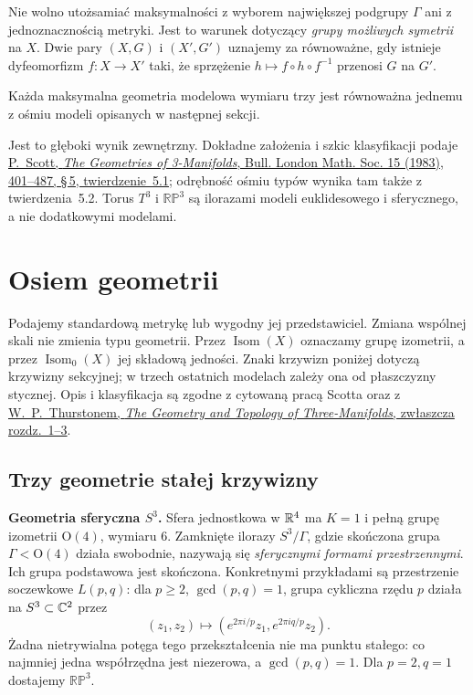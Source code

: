 Nie wolno utożsamiać maksymalności z wyborem największej
podgrupy $\Gamma$ ani z jednoznacznością metryki. Jest to
warunek dotyczący \emph{grupy możliwych symetrii} na $X$.
Dwie pary $(X,G)$ i $(X',G')$ uznajemy za równoważne, gdy
istnieje dyfeomorfizm $f:X\to X'$ taki, że sprzężenie
$h\mapsto f\circ h\circ f^{-1}$ przenosi $G$ na $G'$.

\begin{twierdzenie}
\label{thm:thurston-osiem-modeli}
Każda maksymalna geometria modelowa wymiaru trzy jest równoważna
jednemu z ośmiu modeli opisanych w następnej sekcji.
\end{twierdzenie}
Jest to głęboki wynik zewnętrzny. Dokładne założenia i szkic
klasyfikacji podaje \href{https://sschleimer.warwick.ac.uk/Teach/2021_3MFDS/References/1983the_geometries_of_three-manifolds.pdf}
{P.\ Scott, \emph{The Geometries of 3-Manifolds},
Bull. London Math. Soc. 15 (1983), 401--487, \S\,5,
twierdzenie~5.1}; odrębność ośmiu typów wynika tam także
z twierdzenia~5.2. Torus $T^3$ i $\mathbb{RP}^3$ są ilorazami
modeli euklidesowego i sferycznego, a nie dodatkowymi modelami.

\section{Osiem geometrii}
\label{sec:thurston-eight}

Podajemy standardową metrykę lub wygodny jej przedstawiciel.
Zmiana wspólnej skali nie zmienia typu geometrii. Przez
$\operatorname{Isom}(X)$ oznaczamy grupę izometrii, a przez
$\operatorname{Isom}_0(X)$ jej składową jedności. Znaki krzywizn
poniżej dotyczą krzywizny sekcyjnej; w trzech ostatnich modelach
zależy ona od płaszczyzny stycznej. Opis i klasyfikacja są zgodne
z cytowaną pracą Scotta oraz z
\href{https://library.slmath.org/nonmsri/gt3m/PDF/Thurston-gt3m.pdf}
{W.\ P.\ Thurstonem, \emph{The Geometry and Topology of
Three-Manifolds}, zwłaszcza rozdz.\ 1--3}.

\subsection*{Trzy geometrie stałej krzywizny}

\textbf{Geometria sferyczna $S^3$.}
Sfera jednostkowa w $\mathbb{R}^4$ ma $K=1$ i pełną grupę izometrii
$\mathrm O(4)$, wymiaru $6$. Zamknięte ilorazy $S^3/\Gamma$,
gdzie skończona grupa $\Gamma<\mathrm O(4)$ działa swobodnie,
nazywają się \emph{sferycznymi formami przestrzennymi}.
Ich grupa podstawowa jest skończona.
Konkretnymi przykładami są przestrzenie soczewkowe
$L(p,q)$: dla $p\geq2$, $\gcd(p,q)=1$, grupa cykliczna rzędu $p$
działa na $S^3\subset\mathbb{C}^2$ przez
\[
 (z_1,z_2)\longmapsto
 (e^{2\pi i/p}z_1,e^{2\pi iq/p}z_2).
\]
Żadna nietrywialna potęga tego przekształcenia nie ma punktu
stałego: co najmniej jedna współrzędna jest niezerowa, a
$\gcd(p,q)=1$. Dla $p=2,q=1$ dostajemy $\mathbb{RP}^3$.

